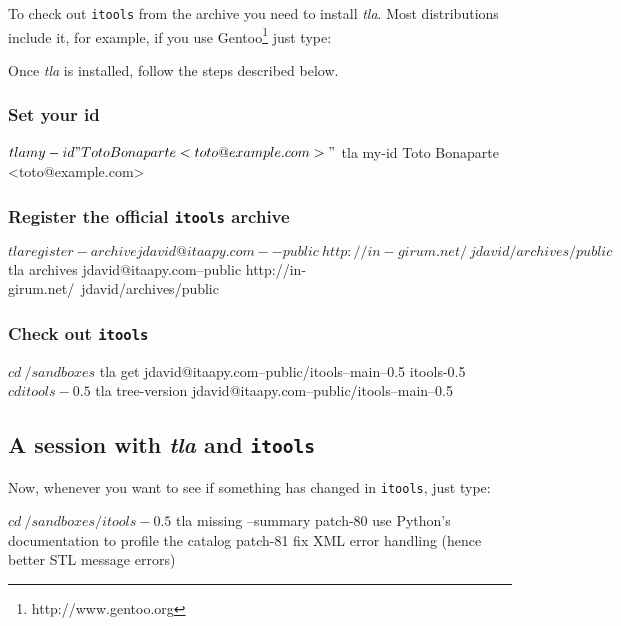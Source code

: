 To check out {\tt itools} from the archive you need to install {\em tla}.
Most distributions include it, for example, if you use
Gentoo\footnote{http://www.gentoo.org} just type:


Once {\em tla} is installed, follow the steps described below.


\subsubsection{Set your id}

\begin{code}
    $ tla my-id "Toto Bonaparte <toto@example.com>"
    $ tla my-id
    Toto Bonaparte <toto@example.com>
\end{code}


\subsubsection{Register the official {\tt itools} archive}

\begin{code}
    $ tla register-archive jdavid@itaapy.com--public \
          http://in-girum.net/~jdavid/archives/public
    $ tla archives
    jdavid@itaapy.com--public
        http://in-girum.net/~jdavid/archives/public
\end{code}


\subsubsection{Check out {\tt itools}}

\begin{code}
    $ cd ~/sandboxes
    $ tla get jdavid@itaapy.com--public/itools--main--0.5 itools-0.5
    $ cd itools-0.5
    $ tla tree-version
    jdavid@itaapy.com--public/itools--main--0.5
\end{code}

\subsection{A session with {\em tla} and {\tt itools}}

Now, whenever you want to see if something has changed in {\tt itools},
just type:

\begin{code}
    $ cd ~/sandboxes/itools-0.5
    $ tla missing --summary
    patch-80
        use Python's documentation to profile the catalog
    patch-81
        fix XML error handling (hence better STL message errors)
\end{code}

